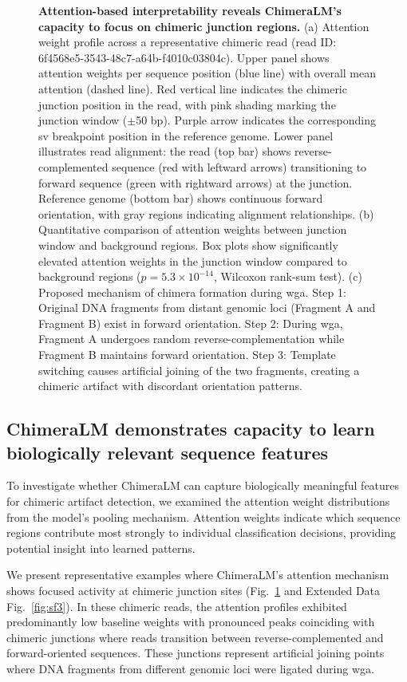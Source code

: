 \documentclass[pdflatex,sn-nature]{sn-jnl}%
\theoremstyle{thmstyleone}%
\theoremstyle{thmstyletwo}%
\theoremstyle{thmstylethree}%
\begin{document}
\begin{figure}[!ht]
	\caption{{\bf Attention-based interpretability reveals ChimeraLM's capacity to focus on chimeric junction regions.}
		(a) Attention weight profile across a representative chimeric read (read ID: 6f4568e5-3543-48c7-a64b-f4010c03804c). Upper panel shows attention weights per sequence position (blue line) with overall mean attention (dashed line). Red vertical line indicates the chimeric junction position in the read, with pink shading marking the junction window ($\pm$50 bp). Purple arrow indicates the corresponding \gls{sv} breakpoint position in the reference genome. Lower panel illustrates read alignment: the read (top bar) shows reverse-complemented sequence (red with leftward arrows) transitioning to forward sequence (green with rightward arrows) at the junction. Reference genome (bottom bar) shows continuous forward orientation, with gray regions indicating alignment relationships.
		(b) Quantitative comparison of attention weights between junction window and background regions. Box plots show significantly elevated attention weights in the junction window compared to background regions ($p = 5.3 \times 10^{-14}$, Wilcoxon rank-sum test).
		(c) Proposed mechanism of chimera formation during \gls{wga}. Step 1: Original DNA fragments from distant genomic loci (Fragment A and Fragment B) exist in forward orientation. Step 2: During \gls{wga}, Fragment A undergoes random reverse-complementation while Fragment B maintains forward orientation. Step 3: Template switching causes artificial joining of the two fragments, creating a chimeric artifact with discordant orientation patterns.}\label{fig:figure4}
\end{figure}

\subsection*{ChimeraLM demonstrates capacity to learn biologically relevant sequence features}

To investigate whether ChimeraLM can capture biologically meaningful features for chimeric artifact detection, we examined the attention weight distributions from the model's pooling mechanism.
Attention weights indicate which sequence regions contribute most strongly to individual classification decisions, providing potential insight into learned patterns.

We present representative examples where ChimeraLM's attention mechanism shows focused activity at chimeric junction sites (Fig.~\ref{fig:figure4} and Extended Data Fig.~\ref{fig:sf3}).
In these chimeric reads, the attention profiles exhibited predominantly low baseline weights with pronounced peaks coinciding with chimeric junctions where reads transition between reverse-complemented and forward-oriented sequences.
These junctions represent artificial joining points where DNA fragments from different genomic loci were ligated during \gls{wga}.
\end{document}
